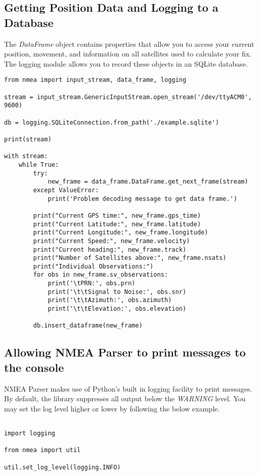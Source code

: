 \newpage
\subsection{Getting Position Data and Logging to a Database}

The \emph{DataFrame} object contains properties that allow you to access your current position, movement, and
information on all satellites used to calculate your fix. The logging module allows you to record these objects in an
SQLite database.


\begin{verbatim}
from nmea import input_stream, data_frame, logging

stream = input_stream.GenericInputStream.open_stream('/dev/ttyACM0', 9600)

db = logging.SQLiteConnection.from_path('./example.sqlite')

print(stream)

with stream:
    while True:
        try:
            new_frame = data_frame.DataFrame.get_next_frame(stream)
        except ValueError:
            print('Problem decoding message to get data frame.')

        print("Current GPS time:", new_frame.gps_time)
        print("Current Latitude:", new_frame.latitude)
        print("Current Longitude:", new_frame.longitude)
        print("Current Speed:", new_frame.velocity)
        print("Current heading:", new_frame.track)
        print("Number of Satellites above:", new_frame.nsats)
        print("Individual Observations:")
        for obs in new_frame.sv_observations:
            print('\tPRN:', obs.prn)
            print('\t\tSignal to Noise:', obs.snr)
            print('\t\tAzimuth:', obs.azimuth)
            print('\t\tElevation:', obs.elevation)

        db.insert_dataframe(new_frame)
\end{verbatim}

\subsection{Allowing NMEA Parser to print messages to the console}

NMEA Parser makes use of Python's built in logging facility to print messages. By default, the library suppresses
all output below the \emph{WARNING} level. You may set the log level higher or lower by following the below example.

\begin{verbatim}

import logging

from nmea import util

util.set_log_level(logging.INFO)

\end{verbatim}
